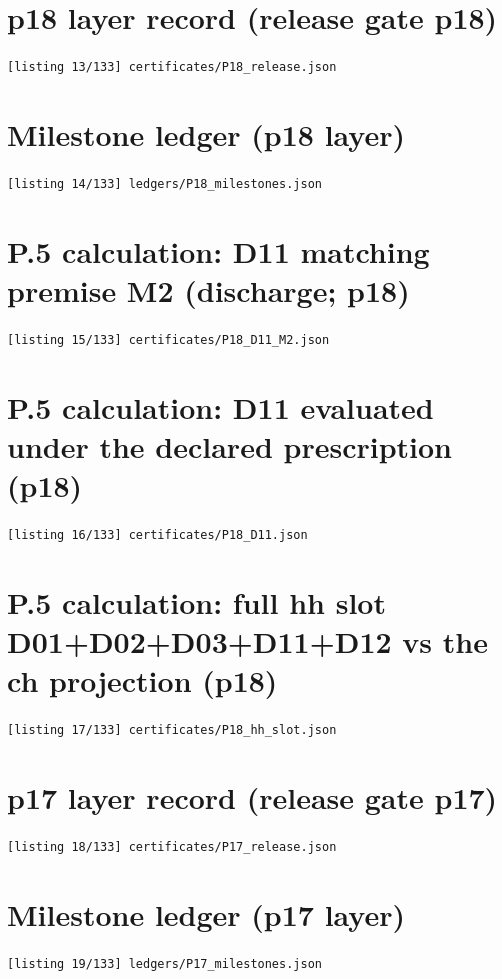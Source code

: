 \section{p18 layer record (release gate p18)}
\noindent\texttt{[listing 13/133] certificates/P18\_release.json}
{\scriptsize}

\section{Milestone ledger (p18 layer)}
\noindent\texttt{[listing 14/133] ledgers/P18\_milestones.json}
{\scriptsize}

\section{P.5 calculation: D11 matching premise M2 (discharge; p18)}
\noindent\texttt{[listing 15/133] certificates/P18\_D11\_M2.json}
{\scriptsize}

\section{P.5 calculation: D11 evaluated under the declared prescription (p18)}
\noindent\texttt{[listing 16/133] certificates/P18\_D11.json}
{\scriptsize}

\section{P.5 calculation: full hh slot D01+D02+D03+D11+D12 vs the ch projection (p18)}
\noindent\texttt{[listing 17/133] certificates/P18\_hh\_slot.json}
{\scriptsize}

\section{p17 layer record (release gate p17)}
\noindent\texttt{[listing 18/133] certificates/P17\_release.json}
{\scriptsize}

\section{Milestone ledger (p17 layer)}
\noindent\texttt{[listing 19/133] ledgers/P17\_milestones.json}
{\scriptsize}

